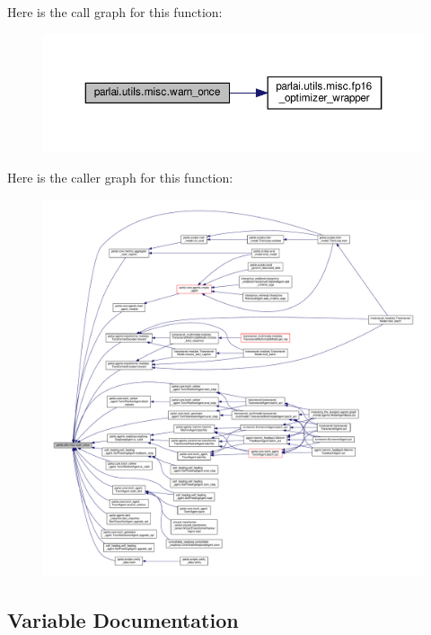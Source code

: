 Here is the call graph for this function\+:
\nopagebreak
\begin{figure}[H]
\begin{center}
\leavevmode
\includegraphics[width=350pt]{namespaceparlai_1_1utils_1_1misc_acf146e70ea7f6867969a7c2b545d4b4b_cgraph}
\end{center}
\end{figure}
Here is the caller graph for this function\+:
\nopagebreak
\begin{figure}[H]
\begin{center}
\leavevmode
\includegraphics[width=350pt]{namespaceparlai_1_1utils_1_1misc_acf146e70ea7f6867969a7c2b545d4b4b_icgraph}
\end{center}
\end{figure}


\subsection{Variable Documentation}
\mbox{\label{namespaceparlai_1_1utils_1_1misc_a3817c467f1d894060a5f5b3954d99598}} 
